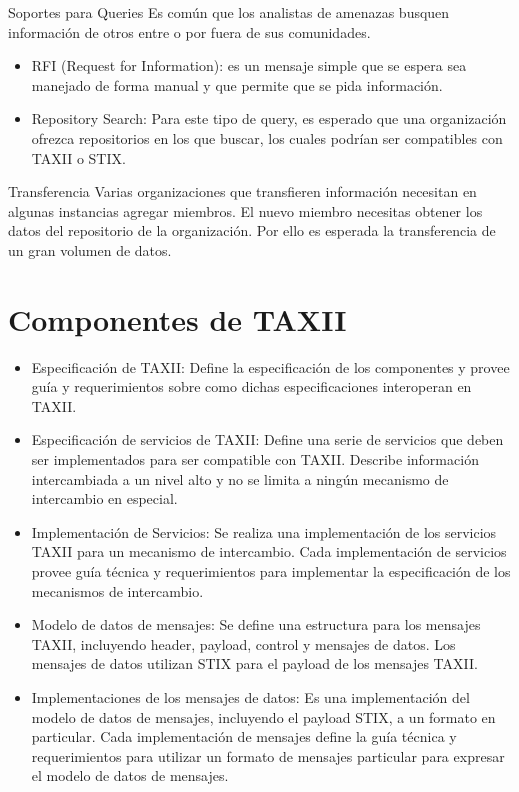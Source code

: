 Soportes para Queries
Es común que los analistas de amenazas busquen información de otros entre o por 
fuera de sus comunidades.
\begin{itemize}
  \item RFI (Request for Information): es un mensaje simple que se espera sea 
  manejado de forma manual y que permite que se pida información.
  \item Repository Search: Para este tipo de query, es esperado que una 
  organización ofrezca repositorios en los que buscar, los cuales podrían ser 
  compatibles con TAXII o STIX.
\end{itemize}

Transferencia
Varias organizaciones que transfieren información necesitan en algunas 
instancias agregar miembros. El nuevo miembro necesitas obtener los datos del 
repositorio de la organización. Por ello es esperada la transferencia de un gran 
volumen de datos.


\section{Componentes de TAXII}
\begin{itemize}
  \item Especificación de TAXII: Define la especificación de los componentes y 
  provee guía y requerimientos sobre como dichas especificaciones interoperan en 
  TAXII.
  \item Especificación de servicios de TAXII: Define una serie de servicios que 
  deben ser implementados para ser compatible con TAXII. Describe información 
  intercambiada a un nivel alto y no se limita a ningún mecanismo de 
  intercambio en especial.
  \item Implementación de Servicios: Se realiza una implementación de los 
  servicios TAXII para un mecanismo de intercambio. Cada implementación de 
  servicios provee guía técnica y requerimientos para implementar la 
  especificación de los mecanismos de intercambio.
  \item Modelo de datos de mensajes: Se define una estructura para los mensajes 
  TAXII, incluyendo header, payload, control y mensajes de datos. Los mensajes 
  de datos utilizan STIX para el payload de los mensajes TAXII.
  \item Implementaciones de los mensajes de datos: Es una implementación del 
  modelo de datos de mensajes, incluyendo el payload STIX, a un formato en 
  particular. Cada implementación de mensajes define la guía técnica y 
  requerimientos  para utilizar un formato de mensajes particular para expresar 
  el modelo de datos de mensajes.
\end{itemize}

